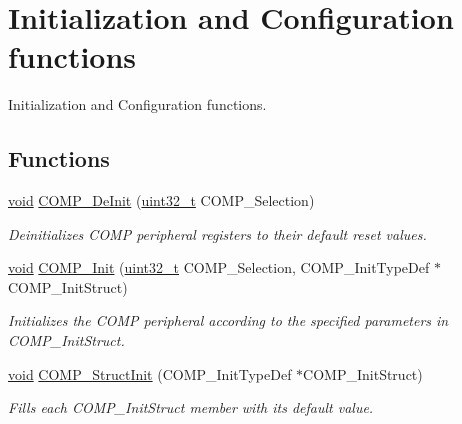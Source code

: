 \hypertarget{group___c_o_m_p___group1}{\section{Initialization and Configuration functions}
\label{group___c_o_m_p___group1}
}


Initialization and Configuration functions.  


\subsection*{Functions}
\begin{DoxyCompactItemize}
\item 
\hyperlink{group___n_a_m_e_ga18028b8badbf1ea7e704ccac3c488e82}{void} \hyperlink{group___c_o_m_p___group1_gadf143687c668ba15411b393ab3fb0482}{C\-O\-M\-P\-\_\-\-De\-Init} (\hyperlink{stdint_8h_a435d1572bf3f880d55459d9805097f62}{uint32\-\_\-t} C\-O\-M\-P\-\_\-\-Selection)
\begin{DoxyCompactList}\small\item\em Deinitializes C\-O\-M\-P peripheral registers to their default reset values. \end{DoxyCompactList}\item 
\hyperlink{group___n_a_m_e_ga18028b8badbf1ea7e704ccac3c488e82}{void} \hyperlink{group___c_o_m_p___group1_ga4921439f818e8873acabdf3ef7e0db0a}{C\-O\-M\-P\-\_\-\-Init} (\hyperlink{stdint_8h_a435d1572bf3f880d55459d9805097f62}{uint32\-\_\-t} C\-O\-M\-P\-\_\-\-Selection, C\-O\-M\-P\-\_\-\-Init\-Type\-Def $\ast$C\-O\-M\-P\-\_\-\-Init\-Struct)
\begin{DoxyCompactList}\small\item\em Initializes the C\-O\-M\-P peripheral according to the specified parameters in C\-O\-M\-P\-\_\-\-Init\-Struct. \end{DoxyCompactList}\item 
\hyperlink{group___n_a_m_e_ga18028b8badbf1ea7e704ccac3c488e82}{void} \hyperlink{group___c_o_m_p___group1_ga6feca94112b7e10174faee8f3cf57e24}{C\-O\-M\-P\-\_\-\-Struct\-Init} (C\-O\-M\-P\-\_\-\-Init\-Type\-Def $\ast$C\-O\-M\-P\-\_\-\-Init\-Struct)
\begin{DoxyCompactList}\small\item\em Fills each C\-O\-M\-P\-\_\-\-Init\-Struct member with its default value. \end{DoxyCompactList}\item 

\end{DoxyCompactItemize}
